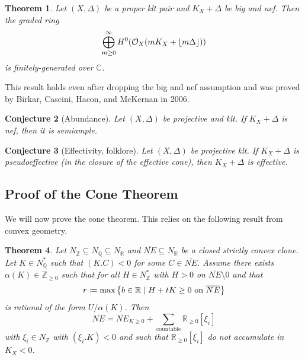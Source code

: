 \documentclass[leqno, openany]{memoir}
\DeclarePairedDelimiter{\floor}{\lfloor}{\rfloor}
\newtheorem{thm}{Theorem}[section]
\newtheorem{conj}[thm]{Conjecture}
\theoremstyle{definition}
\theoremstyle{remark}
\theoremstyle{plain}
\theoremstyle{definition}
\theoremstyle{remark}
\newcommand{\R}{\mathbb{R}}
\newcommand{\C}{\mathbb{C}}
\newcommand{\Z}{\mathbb{Z}}
\newcommand{\Q}{\mathbb{Q}}
\newcommand{\mc}[1]{\mathcal{#1}}
\newcommand{\ol}[1]{\overline{#1}}
\begin{document}
\begin{thm}
    Let $(X, \Delta)$ be a proper klt pair and $K_X + \Delta$ be big and nef. Then the graded ring
    \[ \bigoplus_{m \geq 0}^{\infty} H^0(\mc{O}_X (m K_X + \floor{m \Delta})) \]
    is finitely-generated over $\C$.
\end{thm}

This result holds even after dropping the big and nef assumption and was proved by Birkar, Cascini, Hacon, and McKernan in 2006.

\begin{conj}[Abundance]
    Let $(X, \Delta)$ be projective and klt. If $K_X + \Delta$ is nef, then it is semiample.
\end{conj}

\begin{conj}[Effectivity, folklore]
    Let $(X, \Delta)$ be projective klt. If $K_X + \Delta$ is pseudoeffective (in the closure of the effective cone), then $K_X + \Delta$ is effective.
\end{conj}

\subsection{Proof of the Cone Theorem}%
\label{sub:proof_of_the_cone_theorem}

We will now prove the cone theorem. This relies on the following result from convex geometry.

\begin{thm}
    Let $N_{\Z} \subseteq N_{\Q} \subseteq N_{\R}$ and $\ol{NE} \subseteq N_{\R}$ be a closed strictly convex clone. Let $K \in N_{\Q}^*$ such that $(K.C) < 0$ for some $C \in \ol{NE}$. Assume there exists $\alpha(K) \in \Z_{\geq 0}$ such that for all $H \in N_{\Z}^*$ with $H > 0$ on $\ol{NE} \setminus \qty{0}$ and that
    \[ r \coloneqq \max \qty{b \in \R \mid H + tK \geq 0\ \text{on}\ \ol{NE}} \]
    is rational of the form $U/\alpha(K)$. Then
    \[ \ol{NE} = \ol{NE}_{K \geq 0} + \sum_{\text{countable}} \R_{\geq 0} [\xi_i] \]
    with $\xi_i \in N_{\Z}$ with $(\xi_i.K) < 0$ and such that $\R_{\geq 0} [\xi_i]$ do not accumulate in $K_X < 0$.
\end{thm}
\end{document}
